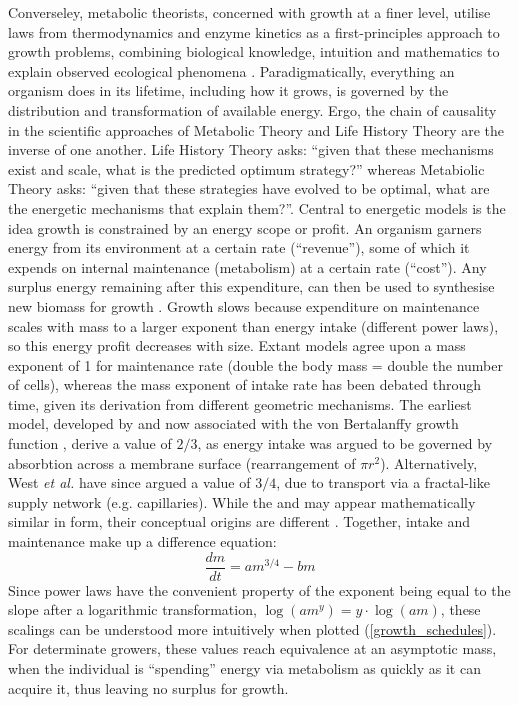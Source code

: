 \documentclass[a4paper]{article} %
\begin{document}
    Converseley, metabolic theorists, concerned with growth at a finer level, utilise laws from thermodynamics and enzyme kinetics as a first-principles approach to growth problems, combining biological knowledge, intuition and mathematics to explain observed ecological phenomena \autocite{Brown2004}. Paradigmatically, everything an organism does in its lifetime, including how it grows, is governed by the distribution and transformation of available energy. Ergo, the chain of causality in the scientific approaches of Metabolic Theory and Life History Theory are the inverse of one another. Life History Theory asks: ``given that these mechanisms exist and scale, what is the predicted optimum strategy?'' whereas Metabiolic Theory asks: ``given that these strategies have evolved to be optimal, what are the energetic mechanisms that explain them?''. Central to energetic models is the idea growth is constrained by an energy scope or profit. An organism garners energy from its environment at a certain rate (``revenue''), some of which it expends on internal maintenance (metabolism) at a certain rate (``cost''). Any surplus energy remaining after this expenditure, can then be used to synthesise new biomass for growth \autocite{Holdway1984, Rochet2001}. Growth slows because expenditure on maintenance scales with mass to a larger exponent than energy intake (different power laws), so this energy profit decreases with size. Extant models agree upon a mass exponent of 1 for maintenance rate (double the body mass = double the number of cells), whereas the mass exponent of intake rate has been debated through time, given its derivation from different geometric mechanisms. The earliest model, developed by \cite{Putter1920} and now associated with the von Bertalanffy growth function \autocite{vonBert1938, VonBertalanffy1957}, derive a value of $2/3$, as energy intake was argued to be governed by absorbtion across a membrane surface (rearrangement of $\pi r^2$). Alternatively, West \textit{et al.} have since argued a value of $3/4$, due to transport via a fractal-like supply network (e.g. capillaries). While the \cite{vonBert1938} and \cite{West2001} may appear mathematically similar in form, their conceptual origins are different \autocite{Barneche2018c}. Together, intake and maintenance make up a difference equation:
    \begin{equation}
        \frac{dm}{dt} = am^{3/4} - bm \label{west_ogm}
    \end{equation}
    Since power laws have the convenient property of the exponent being equal to the slope after a logarithmic transformation, $\log{(am^y)} = y\cdot \log{(am)}$, these scalings can be understood more intuitively when plotted (\cref{growth_schedules}). For determinate growers, these values reach equivalence at an asymptotic mass, when the individual is ``spending'' energy via metabolism as quickly as it can acquire it, thus leaving no surplus for growth.
\end{document}
